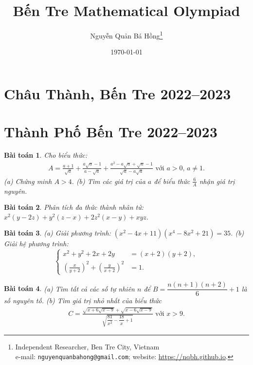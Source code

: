 \documentclass{article}
\title{Bến Tre Mathematical Olympiad}
\author{Nguyễn Quản Bá Hồng\footnote{Independent Researcher, Ben Tre City, Vietnam\\e-mail: \texttt{nguyenquanbahong@gmail.com}; website: \url{https://nqbh.github.io}.}}
\date{\today}
\newtheorem{baitoan}{Bài toán}
\begin{document}
\maketitle
\begin{abstract}
	
\end{abstract}
\tableofcontents


\section{Châu Thành, Bến Tre 2022--2023}


\section{Thành Phố Bến Tre 2022--2023}

\begin{baitoan}
	Cho biểu thức:
	\begin{align*}
		A = \frac{a + 1}{\sqrt{a}} + \frac{a\sqrt{a}  -1}{a - \sqrt{a}} + \frac{a^2 - a\sqrt{a} + \sqrt{a} - 1}{\sqrt{a} - a\sqrt{a}}\mbox{ với } a > 0,\,a\ne1.
	\end{align*}
	(a) Chứng minh $A > 4$. (b) Tìm các giá trị của $a$ để biểu thức $\frac{6}{A}$ nhận giá trị nguyên.
\end{baitoan}

\begin{baitoan}
	Phân tích đa thức thành nhân tử: $x^2(y - 2z) + y^2(z - x) + 2z^2(x - y) + xyz$.
\end{baitoan}

\begin{baitoan}
	(a) Giải phương trình: $(x^2 - 4x + 11)(x^4 - 8x^2 + 21) = 35$. (b) Giải hệ phương trình:
	\begin{equation*}
		\left\{\begin{split}
			x^2 + y^2 + 2x + 2y &= (x + 2)(y + 2),\\
			\left(\frac{x}{y + 2}\right)^2 + \left(\frac{y}{x + 2}\right)^2 &= 1.
		\end{split}\right.
	\end{equation*}
\end{baitoan}

\begin{baitoan}
	(a) Tìm tất cả các số tự nhiên $n$ để $B = \dfrac{n(n + 1)(n + 2)}{6} + 1$ là số nguyên tố. (b) Tìm giá trị nhỏ nhất của biểu thức
	\begin{align*}
		C = \frac{\sqrt{x + 6\sqrt{x - 9}} + \sqrt{x - 6\sqrt{x - 9}}}{\sqrt{\dfrac{81}{x^2} - \dfrac{18}{x} + 1}}\mbox{ với } x > 9.
	\end{align*}
\end{baitoan}
\end{document}
